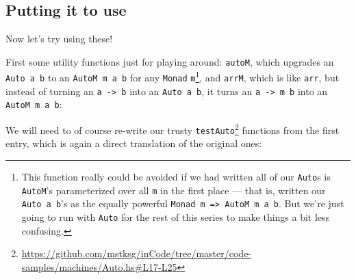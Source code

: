 \documentclass[]{article}
\newenvironment{Shaded}{}{}
\newcommand{\CommentTok}[1]{\textcolor[rgb]{0.38,0.63,0.69}{\textit{#1}}}
\newcommand{\DataTypeTok}[1]{\textcolor[rgb]{0.56,0.13,0.00}{#1}}
\newcommand{\FunctionTok}[1]{\textcolor[rgb]{0.02,0.16,0.49}{#1}}
\newcommand{\KeywordTok}[1]{\textcolor[rgb]{0.00,0.44,0.13}{\textbf{#1}}}
\newcommand{\NormalTok}[1]{#1}
\newcommand{\OtherTok}[1]{\textcolor[rgb]{0.00,0.44,0.13}{#1}}
\renewcommand{\href}[2]{#2\footnote{\url{#1}}}
\begin{document}
\hypertarget{putting-it-to-use}{%
\subsection{Putting it to use}\label{putting-it-to-use}}

Now let's try using these!

First some utility functions just for playing around: \texttt{autoM}, which
upgrades an \texttt{Auto\ a\ b} to an \texttt{AutoM\ m\ a\ b} for any
\texttt{Monad} \texttt{m}\footnote{This function really could be avoided if we
  had written all of our \texttt{Auto}s is \texttt{AutoM}'s parameterized over
  all \texttt{m} in the first place --- that is, written our
  \texttt{Auto\ a\ b}'s as the equally powerful
  \texttt{Monad\ m\ =\textgreater{}\ AutoM\ m\ a\ b}. But we're just going to
  run with \texttt{Auto} for the rest of this series to make things a bit less
  confusing.}, and \texttt{arrM}, which is like \texttt{arr}, but instead of
turning an \texttt{a\ -\textgreater{}\ b} into an \texttt{Auto\ a\ b}, it turns
an \texttt{a\ -\textgreater{}\ m\ b} into an \texttt{AutoM\ m\ a\ b}:

\begin{Shaded}
\end{Shaded}

We will need to of course re-write our trusty
\href{https://github.com/mstksg/inCode/tree/master/code-samples/machines/Auto.hs\#L17-L25}{\texttt{testAuto}}
functions from the first entry, which is again a direct translation of the
original ones:
\end{document}
